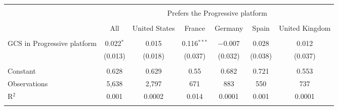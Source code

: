 
\begin{tabular}{@{\extracolsep{5pt}}lcccccc} 
\\[-1.8ex]\hline 
\hline \\[-1.8ex] 
 & \multicolumn{6}{c}{Prefers the Progressive platform} \\ 
\cline{2-7} 
\\[-1.8ex] & All & United States & France & Germany & Spain & United Kingdom \\ 
\hline \\[-1.8ex] 
 GCS in Progressive platform & 0.022$^{*}$ & 0.015 & 0.116$^{***}$ & $-$0.007 & 0.028 & 0.012 \\ 
  & (0.013) & (0.018) & (0.037) & (0.032) & (0.038) & (0.037) \\ 
 \hline \\[-1.8ex] 
Constant & 0.628 & 0.629 & 0.55 & 0.682 & 0.721 & 0.553 \\ 
Observations & 5,638 & 2,797 & 671 & 883 & 550 & 737 \\ 
R$^{2}$ & 0.001 & 0.0002 & 0.014 & 0.0001 & 0.001 & 0.0001 \\ 
\hline 
\hline \\[-1.8ex] 
\end{tabular} 